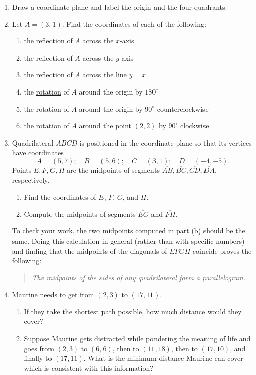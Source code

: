 \documentclass{article}
\begin{document}
\begin{enumerate}
\item Draw a coordinate plane and label the origin and the four quadrants.
\item Let $A = (3,1)$. Find the coordinates of each of the following:
\begin{enumerate}
\item the \href{https://en.wikipedia.org/wiki/Reflection_(mathematics)}{reflection} of $A$ across the $x$-axis
\item the reflection of $A$ across the $y$-axis
\item the reflection of $A$ across the line $y = x$
\item the \href{https://en.wikipedia.org/wiki/Rotation_(mathematics)}{rotation} of $A$ around the origin by $180^{\circ}$
\item the rotation of $A$ around the origin by $90^{\circ}$ counterclockwise
\item the rotation of $A$ around the point $(2,2)$ by $90^{\circ}$ clockwise
\end{enumerate}
\item Quadrilateral $ABCD$ is positioned in the coordinate plane so that its vertices have coordinates
\begin{equation*}
A = (5, 7);\quad B = (5, 6);\quad C = (3, 1);\quad D = (-4, -5).
\end{equation*}
Points $E, F, G, H$ are the midpoints of segments $\overline{AB}, \overline{BC}, \overline{CD}, \overline{DA}$, respectively.
\begin{enumerate}
\item Find the coordinates of $E$, $F$, $G$, and $H$.
\item Compute the midpoints of segments $\overline{EG}$ and $\overline{FH}$.
\end{enumerate}
To check your work, the two midpoints computed in part (b) should be the same. Doing this calculation in general (rather than with specific numbers) and finding that the midpoints of the diagonals of $EFGH$ coincide proves the following:
\begin{quote}
\textit{The midpoints of the sides of any quadrilateral form a parallelogram.}
\end{quote}
\item Maurine needs to get from $(2,3)$ to $(17,11)$.
\begin{enumerate}
\item If they take the shortest path possible, how much distance would they cover?
\item Suppose Maurine gets distracted while pondering the meaning of life and goes from $(2,3)$ to $(6,6)$, then to $(11, 18)$, then to $(17,10)$, and finally to $(17,11)$. What is the minimum distance Maurine can cover which is consistent with this information? 

\end{enumerate}
\end{enumerate}
\end{document}

